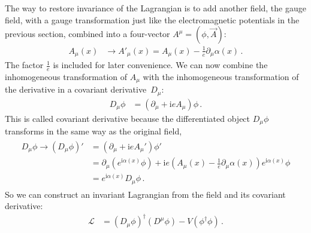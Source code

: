\documentclass[12pt]{report}
\renewcommand{\L}{\ensuremath{\mathscr{L}}}
\renewcommand{\i}{\ensuremath{\text{i}}}
\newcommand{\2}{\ensuremath{\sqrt{2}\,}}
\renewcommand{\L}{\ensuremath{\mathscr{L}}}
\begin{document}
{      The way to restore invariance of the Lagrangian is to add another field, the gauge
      field, with a gauge transformation just like the electromagnetic potentials in the previous
      section, combined into a four-vector $A^\mu=(\phi,\vec{A})$:
      \begin{align}\label{eq:abeliantrafo}
        A_\mu(x) &\to A'_\mu(x) = A_\mu(x) - \frac{1}{e} \partial_\mu \alpha(x)\,.
      \end{align}
      The factor $\frac{1}{e}$ is included for later convenience. We can now combine the
      inhomogeneous transformation of $A_\mu$ with the inhomogeneous transformation of the
      derivative in a covariant derivative~$D_\mu$:
      \begin{align}
        D_\mu \phi &= \left(\partial_\mu +\i e A_\mu\right)\phi\,.
      \end{align}
      This is called covariant derivative because the differentiated object $D_\mu\phi$ transforms in
      the same way as the original field, 
      \begin{align}
        \begin{split}
          D_\mu \phi \longrightarrow \left(D_\mu \phi\right)' &= \left(\partial_\mu +\i e
            A_\mu'\right) \phi'\\ 
          &=\partial_\mu \left(e^{\i\alpha(x)}\phi\right)  +\i e \left(A_\mu(x) - \frac{1}{e}
            \partial_\mu \alpha(x) \right) e^{\i\alpha(x)}\phi\\ 
          &= e^{\i\alpha(x)}D_\mu \phi\,.
        \end{split}
      \end{align}
      So we can construct an invariant Lagrangian from the field and its covariant derivative:
      \begin{align}
        \L&=\left(D_\mu \phi\right)^\dagger \left(D^\mu \phi\right) -
        V\left(\phi^\dagger\phi\right)\,.
      \end{align}
      
}
\end{document}

